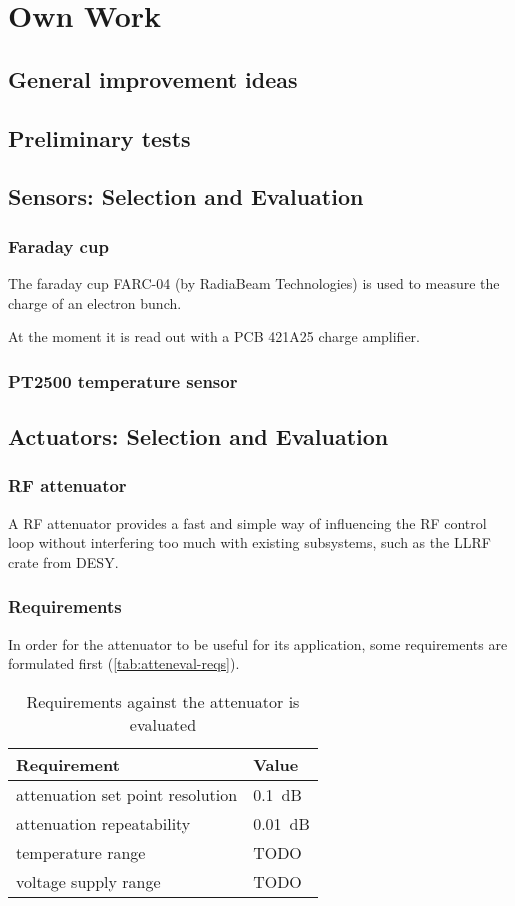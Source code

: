 \chapter{Own Work}
\section{General improvement ideas}
\section{Preliminary tests}
\section{Sensors: Selection and Evaluation}
\subsection{Faraday cup}
The faraday cup FARC-04\cite{radiabeamFaradayCups} (by RadiaBeam Technologies) is used to measure the charge of an electron bunch.

At the moment it is read out with a PCB 421A25\cite{pcbsynotechPCB421A25Charge} charge amplifier.

\subsection{PT2500 temperature sensor}
\section{Actuators: Selection and Evaluation}
\subsection{RF attenuator}
A RF attenuator provides a fast and simple way of influencing the RF control loop without interfering too much with existing subsystems, such as the LLRF crate from DESY.

\FloatBarrier
\subsection{Requirements}
In order for the attenuator to be useful for its application, some requirements are formulated first (\autoref{tab:atteneval-reqs}).

\begin{table}[tbh!]
	\centering
	\caption{Requirements against the attenuator is evaluated}
	\label{tab:atteneval-reqs}
	\begin{tabular}{ll}
		\toprule
		\textbf{Requirement} & \textbf{Value}\\
		\midrule
		attenuation set point resolution & \SI{0.1}{\dB}\\
		attenuation repeatability  & \SI{0.01}{\dB}\\
		\midrule
		temperature range & TODO \\
		voltage supply range & TODO\\
		\bottomrule
	\end{tabular}
\end{table}

